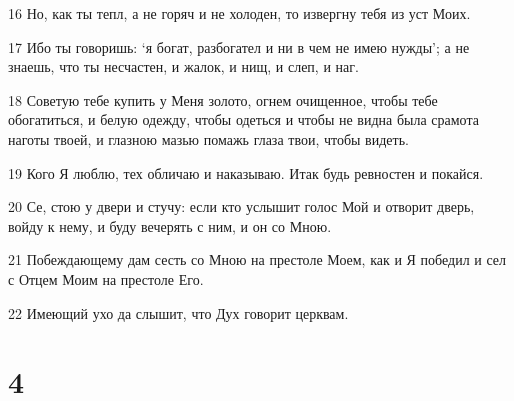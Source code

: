\par 16 Но, как ты тепл, а не горяч и не холоден, то извергну тебя из уст Моих.
\par 17 Ибо ты говоришь: `я богат, разбогател и ни в чем не имею нужды'; а не знаешь, что ты несчастен, и жалок, и нищ, и слеп, и наг.
\par 18 Советую тебе купить у Меня золото, огнем очищенное, чтобы тебе обогатиться, и белую одежду, чтобы одеться и чтобы не видна была срамота наготы твоей, и глазною мазью помажь глаза твои, чтобы видеть.
\par 19 Кого Я люблю, тех обличаю и наказываю. Итак будь ревностен и покайся.
\par 20 Се, стою у двери и стучу: если кто услышит голос Мой и отворит дверь, войду к нему, и буду вечерять с ним, и он со Мною.
\par 21 Побеждающему дам сесть со Мною на престоле Моем, как и Я победил и сел с Отцем Моим на престоле Его.
\par 22 Имеющий ухо да слышит, что Дух говорит церквам.

\chapter{4}

